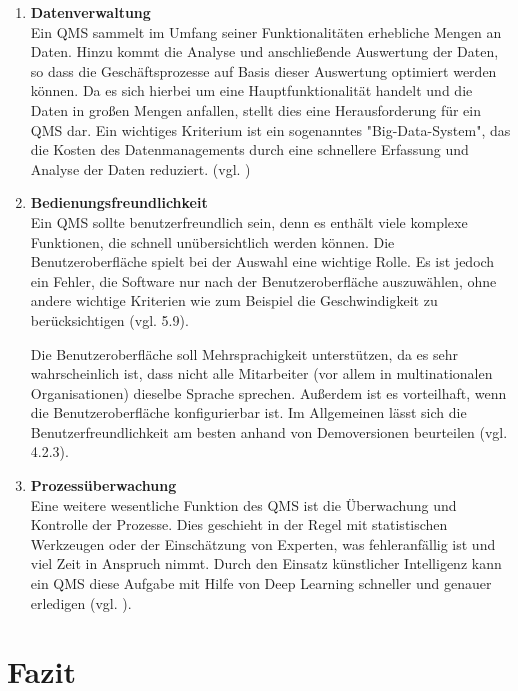 \documentclass[11pt]{scrartcl}       %
\begin{document}
\begin{enumerate}

\item[] \textbf{Datenverwaltung} \\
Ein QMS sammelt im Umfang seiner Funktionalitäten erhebliche Mengen an Daten. Hinzu kommt die Analyse und anschließende Auswertung der Daten, so dass die Geschäftsprozesse auf Basis dieser Auswertung optimiert werden können. Da es sich hierbei um eine Hauptfunktionalität handelt und die Daten in großen Mengen anfallen, stellt dies eine Herausforderung für ein QMS dar. Ein wichtiges Kriterium ist ein sogenanntes "Big-Data-System", das die Kosten des Datenmanagements durch eine schnellere Erfassung und Analyse der Daten reduziert. (vgl. \cite{alexandrova2020Information})

\item[] \textbf{Bedienungsfreundlichkeit} \\ 
Ein QMS sollte benutzerfreundlich sein, denn es enthält viele komplexe Funktionen, die schnell unübersichtlich werden können. Die Benutzeroberfläche spielt bei der Auswahl eine wichtige Rolle. Es ist jedoch ein Fehler, die Software nur nach der Benutzeroberfläche auszuwählen, ohne andere wichtige Kriterien wie zum Beispiel die Geschwindigkeit zu berücksichtigen (vgl. \cite{teich2008richtige} 5.9).

Die Benutzeroberfläche soll Mehrsprachigkeit unterstützen, da es sehr wahrscheinlich ist, dass nicht alle Mitarbeiter (vor allem in multinationalen Organisationen) dieselbe Sprache sprechen. Außerdem ist es vorteilhaft, wenn die Benutzeroberfläche konfigurierbar ist. Im Allgemeinen lässt sich die Benutzerfreundlichkeit am besten anhand von Demoversionen beurteilen (vgl. \cite{pfeifer2021masing} 4.2.3).

\item[] \textbf{Prozessüberwachung} \\
Eine weitere wesentliche Funktion des QMS ist die Überwachung und Kontrolle der Prozesse. Dies geschieht in der Regel mit statistischen Werkzeugen oder der Einschätzung von Experten, was fehleranfällig ist und viel Zeit in Anspruch nimmt. Durch den Einsatz künstlicher Intelligenz kann ein QMS diese Aufgabe mit Hilfe von Deep Learning schneller und genauer erledigen (vgl. \cite{alexandrova2020Information}).
\end{enumerate}


\section{Fazit}
\end{document}
